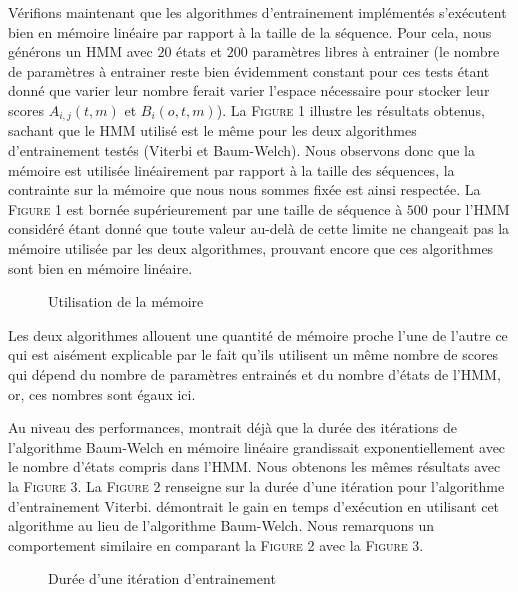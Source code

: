 \documentclass[letterpaper]{article}
\begin{document}
Vérifions maintenant que les algorithmes d'entrainement implémentés s'exécutent bien en mémoire linéaire par rapport à la taille de la séquence. Pour cela, nous générons un HMM avec $20$ états et $200$ paramètres libres à entrainer (le nombre de paramètres à entrainer reste bien évidemment constant pour ces tests étant donné que varier leur nombre ferait varier l'espace nécessaire pour stocker leur scores $A_{i,j}(t, m)$ et $B_i(o,t,m)$). La \textsc{Figure 1} illustre les résultats obtenus, sachant que le HMM utilisé est le même pour les deux algorithmes d'entrainement testés (Viterbi et Baum-Welch). Nous observons donc que la mémoire est utilisée linéairement par rapport à la taille des séquences, la contrainte sur la mémoire que nous nous sommes fixée est ainsi respectée. La \textsc{Figure 1} est bornée supérieurement par une taille de séquence à $500$ pour l'HMM considéré étant donné que toute valeur au-delà de cette limite ne changeait pas la mémoire utilisée par les deux algorithmes, prouvant encore que ces algorithmes sont bien en mémoire linéaire. \\

\begin{figure}[H]
  \centering
  \caption{Utilisation de la mémoire}
\end{figure}

Les deux algorithmes allouent une quantité de mémoire proche l'une de l'autre ce qui est aisément explicable par le fait qu'ils utilisent un même nombre de scores qui dépend du nombre de paramètres entrainés et du nombre d'états de l'HMM, or, ces nombres sont égaux ici.

Au niveau des performances, \cite{Ch} montrait déjà que la durée des itérations de l'algorithme Baum-Welch en mémoire linéaire grandissait exponentiellement avec le nombre d'états compris dans l'HMM. Nous obtenons les mêmes résultats avec la \textsc{Figure 3}. La \textsc{Figure 2} renseigne sur la durée d'une itération pour l'algorithme d'entrainement Viterbi. \cite{LM} démontrait le gain en temps d'exécution en utilisant cet algorithme au lieu de l'algorithme Baum-Welch. Nous remarquons un comportement similaire en comparant la \textsc{Figure 2} avec la \textsc{Figure 3}. 

\begin{figure}[H]
  \centering
  \caption{Durée d'une itération d'entrainement}
\end{figure}
\end{document}

